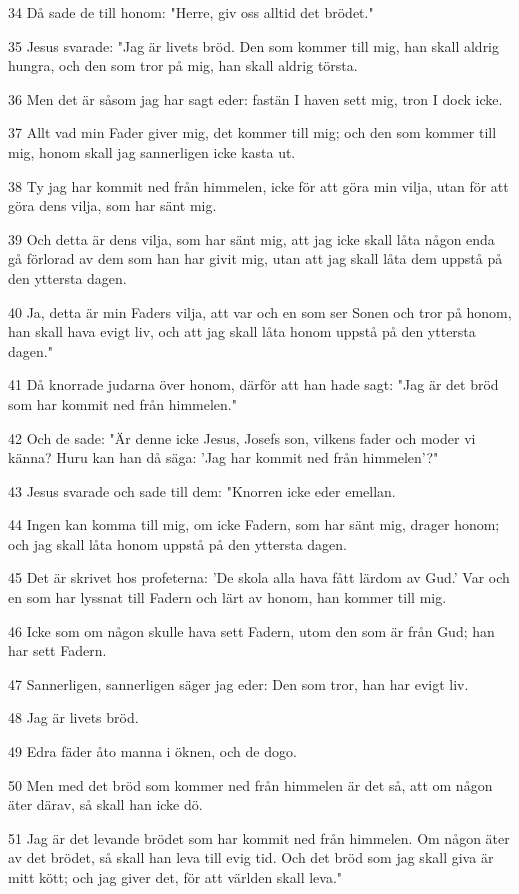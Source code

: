 \par 34 Då sade de till honom: "Herre, giv oss alltid det brödet."
\par 35 Jesus svarade: "Jag är livets bröd. Den som kommer till mig, han skall aldrig hungra, och den som tror på mig, han skall aldrig törsta.
\par 36 Men det är såsom jag har sagt eder: fastän I haven sett mig, tron I dock icke.
\par 37 Allt vad min Fader giver mig, det kommer till mig; och den som kommer till mig, honom skall jag sannerligen icke kasta ut.
\par 38 Ty jag har kommit ned från himmelen, icke för att göra min vilja, utan för att göra dens vilja, som har sänt mig.
\par 39 Och detta är dens vilja, som har sänt mig, att jag icke skall låta någon enda gå förlorad av dem som han har givit mig, utan att jag skall låta dem uppstå på den yttersta dagen.
\par 40 Ja, detta är min Faders vilja, att var och en som ser Sonen och tror på honom, han skall hava evigt liv, och att jag skall låta honom uppstå på den yttersta dagen."
\par 41 Då knorrade judarna över honom, därför att han hade sagt: "Jag är det bröd som har kommit ned från himmelen."
\par 42 Och de sade: "Är denne icke Jesus, Josefs son, vilkens fader och moder vi känna? Huru kan han då säga: 'Jag har kommit ned från himmelen'?"
\par 43 Jesus svarade och sade till dem: "Knorren icke eder emellan.
\par 44 Ingen kan komma till mig, om icke Fadern, som har sänt mig, drager honom; och jag skall låta honom uppstå på den yttersta dagen.
\par 45 Det är skrivet hos profeterna: 'De skola alla hava fått lärdom av Gud.' Var och en som har lyssnat till Fadern och lärt av honom, han kommer till mig.
\par 46 Icke som om någon skulle hava sett Fadern, utom den som är från Gud; han har sett Fadern.
\par 47 Sannerligen, sannerligen säger jag eder: Den som tror, han har evigt liv.
\par 48 Jag är livets bröd.
\par 49 Edra fäder åto manna i öknen, och de dogo.
\par 50 Men med det bröd som kommer ned från himmelen är det så, att om någon äter därav, så skall han icke dö.
\par 51 Jag är det levande brödet som har kommit ned från himmelen. Om någon äter av det brödet, så skall han leva till evig tid. Och det bröd som jag skall giva är mitt kött; och jag giver det, för att världen skall leva."
